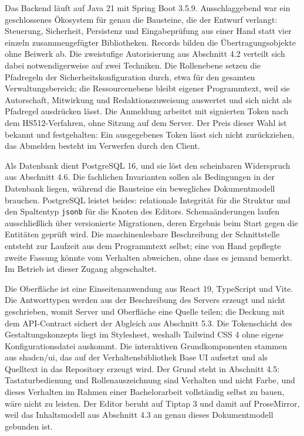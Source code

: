 Das Backend läuft auf Java 21 mit Spring Boot 3.5.9. Ausschlaggebend war ein geschlossenes Ökosystem für genau die Bausteine, die der Entwurf verlangt: Steuerung, Sicherheit, Persistenz und Eingabeprüfung aus einer Hand statt vier einzeln zusammengefügter Bibliotheken. Records bilden die Übertragungsobjekte ohne Beiwerk ab. Die zweistufige Autorisierung aus Abschnitt 4.2 verteilt sich dabei notwendigerweise auf zwei Techniken. Die Rollenebene setzen die Pfadregeln der Sicherheitskonfiguration durch, etwa für den gesamten Verwaltungsbereich; die Ressourcenebene bleibt eigener Programmtext, weil sie Autorschaft, Mitwirkung und Redaktionszuweisung auswertet und sich nicht als Pfadregel ausdrücken lässt. Die Anmeldung arbeitet mit signierten Token nach dem HS512-Verfahren, ohne Sitzung auf dem Server. Der Preis dieser Wahl ist bekannt und festgehalten: Ein ausgegebenes Token lässt sich nicht zurückziehen, das Abmelden besteht im Verwerfen durch den Client.

Als Datenbank dient PostgreSQL 16, und sie löst den scheinbaren Widerspruch aus Abschnitt 4.6. Die fachlichen Invarianten sollen als Bedingungen in der Datenbank liegen, während die Bausteine ein bewegliches Dokumentmodell brauchen. PostgreSQL leistet beides: relationale Integrität für die Struktur und den Spaltentyp \texttt{jsonb} für die Knoten des Editors. Schemaänderungen laufen ausschließlich über versionierte Migrationen, deren Ergebnis beim Start gegen die Entitäten geprüft wird. Die maschinenlesbare Beschreibung der Schnittstelle entsteht zur Laufzeit aus dem Programmtext selbst; eine von Hand gepflegte zweite Fassung könnte vom Verhalten abweichen, ohne dass es jemand bemerkt. Im Betrieb ist dieser Zugang abgeschaltet.

Die Oberfläche ist eine Einseitenanwendung aus React 19, TypeScript und Vite. Die Antworttypen werden aus der Beschreibung des Servers erzeugt und nicht geschrieben, womit Server und Oberfläche eine Quelle teilen; die Deckung mit dem API-Contract sichert der Abgleich aus Abschnitt 5.3. Die Tokenschicht des Gestaltungskonzepts liegt im Stylesheet, weshalb Tailwind CSS 4 ohne eigene Konfigurationsdatei auskommt. Die interaktiven Grundkomponenten stammen aus shadcn/ui, das auf der Verhaltensbibliothek Base UI aufsetzt und als Quelltext in das Repository erzeugt wird. Der Grund steht in Abschnitt 4.5: Tastaturbedienung und Rollenauszeichnung sind Verhalten und nicht Farbe, und dieses Verhalten im Rahmen einer Bachelorarbeit vollständig selbst zu bauen, wäre nicht zu leisten. Der Editor beruht auf Tiptap 3 und damit auf ProseMirror, weil das Inhaltsmodell aus Abschnitt 4.3 an genau dieses Dokumentmodell gebunden ist.

